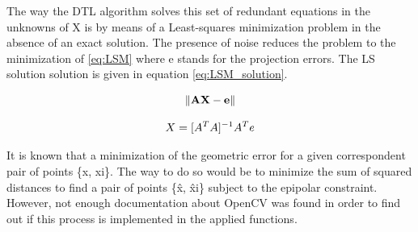 The way the DTL algorithm solves this set of redundant equations in the unknowns of X is by means of a Least-squares minimization problem in the absence of an exact solution. 
The presence of noise reduces the problem to the minimization of \ref{eq:LSM} where e stands for the projection errors.
The LS solution solution is given in equation \ref{eq:LSM_solution}.

\begin{equation}
	\centering
	\lVert \mathbf{AX-e} \rVert 
	\label{eq:LSM}
\end{equation}

\begin{equation}
	\centering
	X = [A^{T}A]^{-1}A^{T}e
	\label{eq:LSM_solution}
\end{equation}

It is known that a minimization of the geometric error for a given correspondent pair of points \{x, xi\}. The way to do so would be to minimize the sum of squared distances to find a pair of points \{\^x, \^xi\} subject to the epipolar constraint. However, not enough documentation about OpenCV was found in order to find out if this process is implemented in the applied functions.





  